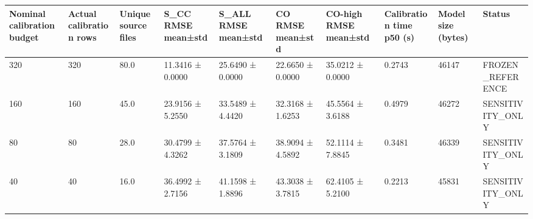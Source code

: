 \begin{tabular}{llllllllll}
 \toprule
Nominal calibration budget & Actual calibration rows & Unique source files & S_CC RMSE mean±std & S_ALL RMSE mean±std & CO RMSE mean±std & CO-high RMSE mean±std & Calibration time p50 (s) & Model size (bytes) & Status \\
 \midrule
320 & 320 & 80.0 & 11.3416 ± 0.0000 & 25.6490 ± 0.0000 & 22.6650 ± 0.0000 & 35.0212 ± 0.0000 & 0.2743 & 46147 & FROZEN\_REFERENCE \\
160 & 160 & 45.0 & 23.9156 ± 5.2550 & 33.5489 ± 4.4420 & 32.3168 ± 1.6253 & 45.5564 ± 3.6188 & 0.4979 & 46272 & SENSITIVITY\_ONLY \\
80 & 80 & 28.0 & 30.4799 ± 4.3262 & 37.5764 ± 3.1809 & 38.9094 ± 4.5892 & 52.1114 ± 7.8845 & 0.3481 & 46339 & SENSITIVITY\_ONLY \\
40 & 40 & 16.0 & 36.4992 ± 2.7156 & 41.1598 ± 1.8896 & 43.3038 ± 3.7815 & 62.4105 ± 5.2100 & 0.2213 & 45831 & SENSITIVITY\_ONLY \\
 \bottomrule
\end{tabular}
